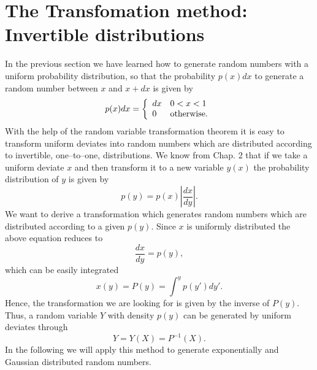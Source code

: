 \section{The Transfomation method: Invertible distributions}
In the previous section we have learned how to generate random 
numbers with a uniform probability distribution, so that the 
probability $p(x)dx$ to generate a random number between $x$ and $x+dx$
is given by
\begin{equation*}
p(x)dx = \left\{ \begin{array}{ll}
                   dx & 0<x<1 \\
                   0   & {\rm otherwise}.
                  \end{array}
         \right.
\end{equation*}
With the help of the random variable transformation theorem it is easy
to transform uniform deviates into random numbers which are 
distributed according to invertible, one--to--one, distributions.
We know from Chap. 2 that if we take a uniform deviate $x$ and then 
transform it to a new variable $y(x)$ the probability distribution
of $y$ is given by
\begin{equation}
p(y) = p(x) \left| \frac{dx}{dy}\right|.
\end{equation}
We want to derive a transformation which generates random numbers 
which are distributed according to a given
$p(y)$. Since $x$ is uniformly distributed the 
above equation reduces to
\begin{equation}
\label{INVERTIBLE}
\frac{dx}{dy} = p(y),
\end{equation}
which can be easily integrated
\begin{equation*}
x(y) = P(y) = \int^y p(y')dy'.
\end{equation*}
Hence, the transformation we are looking for is given by the 
inverse of $P(y)$. Thus, a random variable $Y$ with density $p(y)$
can be generated by uniform deviates through
\begin{equation*}
Y = Y(X) = P^{-1}(X).
\end{equation*}
In the following we will apply this method to generate 
exponentially and Gaussian distributed random numbers.

